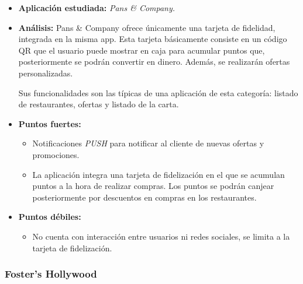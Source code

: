 \documentclass[twoside]{report}
\begin{document}
\begin{itemize}
\item \textbf{Aplicación estudiada:} \cite{pansapp} \textit{Pans \& Company.}
\item \textbf{Análisis:} 
Pans \& Company ofrece únicamente una tarjeta de fidelidad, integrada en la misma app. Esta tarjeta básicamente consiste en un código QR que el usuario puede mostrar en caja para acumular puntos que, posteriormente se podrán convertir en dinero. Además, se realizarán ofertas personalizadas.

Sus funcionalidades son las típicas de una aplicación de esta categoría: listado de restaurantes, ofertas y listado de la carta.
\item \textbf{Puntos fuertes:}
	\begin{itemize}
	\item Notificaciones \textit{PUSH} para notificar al cliente de nuevas ofertas y promociones.
	\item La aplicación integra una tarjeta de fidelización en el que se acumulan puntos a la hora de realizar compras. Los puntos se podrán canjear posteriormente por descuentos en compras en los restaurantes.
	\end{itemize}
\item \textbf{Puntos débiles:}
	\begin{itemize}
	\item No cuenta con interacción entre usuarios ni redes sociales, se limita a la tarjeta de fidelización.
	\end{itemize}
\end{itemize}

\subsubsection{Foster's Hollywood}
\end{document}
